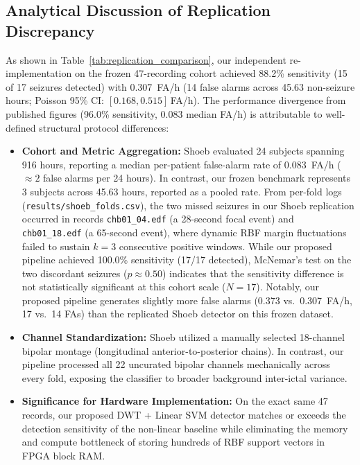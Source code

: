 \documentclass[10pt,twocolumn,letterpaper]{article}
\begin{document}
{\subsection{Analytical Discussion of Replication Discrepancy}
As shown in Table~\ref{tab:replication_comparison}, our independent re-implementation on the frozen 47-recording cohort achieved 88.2\% sensitivity (15 of 17 seizures detected) with 0.307~FA/h (14 false alarms across 45.63 non-seizure hours; Poisson 95\% CI: $[0.168, 0.515]$\,FA/h). The performance divergence from published figures (96.0\% sensitivity, 0.083 median FA/h) is attributable to well-defined structural protocol differences:
\begin{itemize}
    \item \textbf{Cohort and Metric Aggregation:} Shoeb evaluated 24 subjects spanning 916 hours, reporting a median per-patient false-alarm rate of 0.083~FA/h ($\approx 2$ false alarms per 24 hours). In contrast, our frozen benchmark represents 3 subjects across 45.63 hours, reported as a pooled rate. From per-fold logs (\texttt{results/shoeb\_folds.csv}), the two missed seizures in our Shoeb replication occurred in records \texttt{chb01\_04.edf} (a 28-second focal event) and \texttt{chb01\_18.edf} (a 65-second event), where dynamic RBF margin fluctuations failed to sustain $k=3$ consecutive positive windows. While our proposed pipeline achieved 100.0\% sensitivity (17/17 detected), McNemar's test on the two discordant seizures ($p \approx 0.50$) indicates that the sensitivity difference is not statistically significant at this cohort scale ($N=17$). Notably, our proposed pipeline generates slightly more false alarms (0.373 vs.\ 0.307~FA/h, 17 vs.\ 14 FAs) than the replicated Shoeb detector on this frozen dataset.
    \item \textbf{Channel Standardization:} Shoeb \cite{shoeb2010icml} utilized a manually selected 18-channel bipolar montage (longitudinal anterior-to-posterior chains). In contrast, our pipeline processed all 22 uncurated bipolar channels mechanically across every fold, exposing the classifier to broader background inter-ictal variance.
    \item \textbf{Significance for Hardware Implementation:} On the exact same 47 records, our proposed DWT + Linear SVM detector matches or exceeds the detection sensitivity of the non-linear baseline while eliminating the memory and compute bottleneck of storing hundreds of RBF support vectors in FPGA block RAM.
\end{itemize}
}
\end{document}
